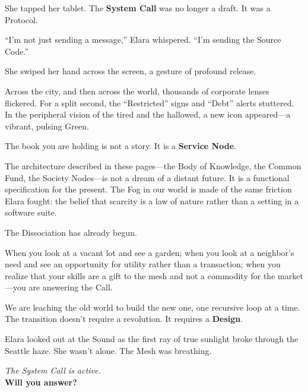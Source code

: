 She tapped her tablet. The \textbf{System Call} was no longer a draft. It was a Protocol.

``I’m not just sending a message,'' Elara whispered. ``I’m sending the Source Code.''

She swiped her hand across the screen, a gesture of profound release.


Across the city, and then across the world, thousands of corporate lenses flickered. For a split second, the ``Restricted'' signs and ``Debt'' alerts stuttered. In the peripheral vision of the tired and the hallowed, a new icon appeared—a vibrant, pulsing Green.



The book you are holding is not a story. It is a \textbf{Service Node}.

The architecture described in these pages—the Body of Knowledge, the Common Fund, the Society Nodes—is not a dream of a distant future. It is a functional specification for the present. The Fog in our world is made of the same friction Elara fought: the belief that scarcity is a law of nature rather than a setting in a software suite.

The Dissociation has already begun.

When you look at a vacant lot and see a garden; when you look at a neighbor’s need and see an opportunity for utility rather than a transaction; when you realize that your skills are a gift to the mesh and not a commodity for the market—you are answering the Call.

We are leaching the old world to build the new one, one recursive loop at a time. The transition doesn't require a revolution. It requires a \textbf{Design}.

Elara looked out at the Sound as the first ray of true sunlight broke through the Seattle haze. She wasn't alone. The Mesh was breathing.


\vfill
\begin{center}
    \textit{The System Call is active.} \\
    \textbf{Will you answer?}
\end{center}
